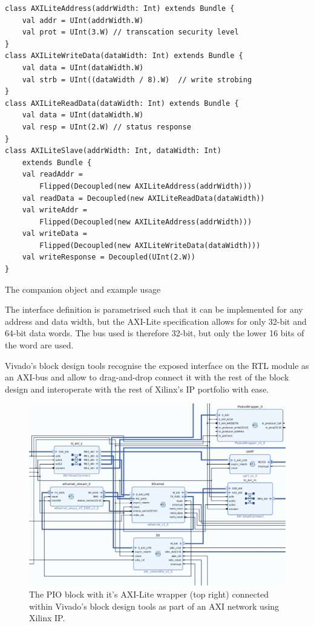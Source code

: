 \begin{listing}[h!]
    \centering
    \vspace{0.5cm}
    \begin{verbatim}
class AXILiteAddress(addrWidth: Int) extends Bundle {
    val addr = UInt(addrWidth.W) 
    val prot = UInt(3.W) // transcation security level        
}   
class AXILiteWriteData(dataWidth: Int) extends Bundle {
    val data = UInt(dataWidth.W)
    val strb = UInt((dataWidth / 8).W)  // write strobing
}
class AXILiteReadData(dataWidth: Int) extends Bundle {
    val data = UInt(dataWidth.W)
    val resp = UInt(2.W) // status response
}
class AXILiteSlave(addrWidth: Int, dataWidth: Int) 
    extends Bundle {
    val readAddr = 
        Flipped(Decoupled(new AXILiteAddress(addrWidth)))   
    val readData = Decoupled(new AXILiteReadData(dataWidth))        
    val writeAddr = 
        Flipped(Decoupled(new AXILiteAddress(addrWidth)))  
    val writeData = 
        Flipped(Decoupled(new AXILiteWriteData(dataWidth)))
    val writeResponse = Decoupled(UInt(2.W))                             
}
    \end{verbatim}
    \caption{The  companion object and example usage}
    \label{lst:axi}
\end{listing}

The interface definition is parametrised such that it can be implemented for any address and data width, but the AXI-Lite specification allows for only 32-bit and 64-bit data words. The bus used is therefore 32-bit, but only the lower 16 bits of the word are used.

Vivado's block design tools recognise the exposed interface on the RTL module as an AXI-bus and allow to drag-and-drop connect it with the rest of the block design and interoperate with the rest of Xilinx's IP portfolio with ease.

\begin{figure}[h]
    \centering
    \includegraphics[width=1\textwidth]{../img/axi-net.png}
    \caption{The PIO block with it's AXI-Lite wrapper (top right) connected within Vivado's block design tools as part of an AXI network using Xilinx IP.}
    \label{fig:axi-net}
\end{figure}

